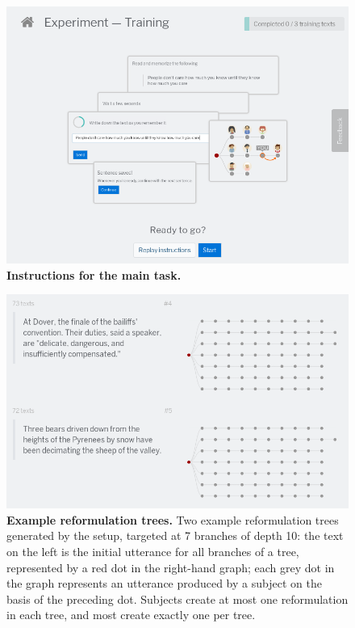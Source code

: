 \begin{figure}[!ht]
  \centering
  \includegraphics[width=.85\linewidth]{images/manual/gistr-instructions-training.png}
  \caption[Instructions for the main task]{
  \textbf{Instructions for the main task.}
  }
  \label{fig:gistr-instructions}
\end{figure}

\begin{figure}[!ht]
  \centering
  \includegraphics[width=.85\linewidth]{images/manual/gistr-trees.png}
  \caption[Example reformulation trees]{
  \textbf{Example reformulation trees.}
  Two example reformulation trees generated by the setup, targeted at 7 branches of depth 10:
  the text on the left is the initial utterance for all branches of a tree, represented by a red dot in the right-hand graph; each grey dot in the graph represents an utterance produced by a subject on the basis of the preceding dot.
  Subjects create at most one reformulation in each tree, and most create exactly one per tree.
  }
  \label{fig:gistr-trees}
\end{figure}

